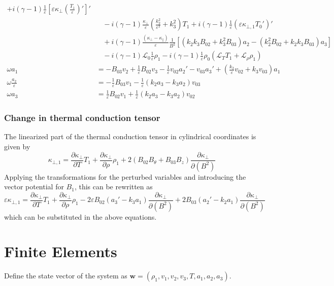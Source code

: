 \documentclass[11pt, fleqn]{article}
\newcommand{\HL}{\mathscr{L}}
\newcommand{\eps}{\varepsilon}
\begin{document}
\begin{equation}
\begin{aligned}
																					+ i(\gamma - 1)\frac{1}{\eps}\left[\eps\kappa_\bot\left(\frac{T_1}{\eps}\right)'\right]'																																												\\
																		&~~~~ - i(\gamma - 1)\frac{\kappa_\bot}{\eps}\left(\frac{k_2^2}{\eps^2} + k_3^2\right)T_1 + i(\gamma - 1)\frac{1}{\eps}\left(\eps\kappa_{\bot, 1}T_0'\right)'													\\
																		&~~~~ + i(\gamma - 1)\frac{(\kappa_\bot - \kappa_\parallel)}{\eps}\frac{1}{B^2}\left[\left(k_2k_3B_{02} + k_3^2B_{03}\right)a_2 - \left(k_2^2B_{02} + k_2k_3B_{03}\right)a_3\right]		\\
																		&~~~~ - i(\gamma - 1)\HL_0\frac{1}{\eps}\rho_1 - i(\gamma - 1)\frac{1}{\eps}\rho_0\left(\HL_T T_1 + \HL_\rho \rho_1\right)																														\\[8pt]
		\omega a_1											&= -B_{03}v_2 + \frac{1}{\eps}B_{02}v_3 - \frac{1}{\eps}v_{02}a_2' - v_{03}a_3' + \left(\frac{k_2}{\eps}v_{02} + k_3v_{03}\right)a_1																									\\[8pt]
		\omega \frac{a_2}{\eps}					&= -\frac{1}{\eps}B_{03}v_1 - \frac{1}{\eps}\left(k_2a_3 - k_3a_2\right)v_{03}																																																				\\[8pt]
		\omega a_3											&= \frac{1}{\eps}B_{02}v_1 + \frac{1}{\eps}\left(k_2a_3 - k_3a_2\right)v_{02}																				
	\end{aligned}
\end{equation}

\newpage
\subsubsection{Change in thermal conduction tensor}
The linearized part of the thermal conduction tensor in cylindrical coordinates is given by
\begin{equation}
	\kappa_{\bot, 1} = \frac{\partial \kappa_\bot}{\partial T}T_1 + \frac{\partial \kappa_\bot}{\partial \rho}\rho_1 + 2\left(B_{02}B_\theta + B_{03}B_z\right)\frac{\partial \kappa_\bot}{\partial(B^2)}
\end{equation}
Applying the transformations for the perturbed variables and introducing the vector potential for $B_1$, this can be rewritten as
\begin{equation}
	\eps\kappa_{\bot, 1} = \frac{\partial \kappa_\bot}{\partial T}T_1 + \frac{\partial \kappa_\bot}{\partial \rho}\rho_1 - 2\eps B_{02}\left(a_3' - k_3a_1\right)\frac{\partial \kappa_\bot}{\partial (B^2)}
											+ 2B_{03}\left(a_2' - k_2a_1\right)\frac{\partial \kappa_\bot}{\partial (B^2)}
\end{equation}
which can be substituted in the above equations.



\section{Finite Elements}
Define the state vector of the system as $\boldsymbol{w} = (\rho_1, v_1, v_2, v_3, T, a_1, a_2, a_3)$.
\end{document}
